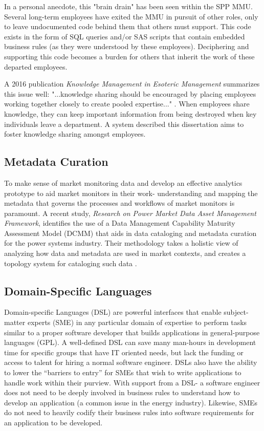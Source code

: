 In a personal anecdote, this "brain drain" has been seen within the SPP MMU. Several long-term employees have exited the MMU in pursuit of other roles, only to leave undocumented code behind them that others must support. This code exists in the form of SQL queries and/or SAS scripts that contain embedded business rules (as they were understood by these employees). Deciphering and supporting this code becomes a burden for others that inherit the work of these departed employees.

A 2016 publication \textit{Knowledge Management in Esoteric Management} summarizes this issue well: "...knowledge sharing should be encouraged by placing employees working together closely to create pooled expertise..." \cite{knowledge-management-in-esoteric-management}. When employees share knowledge, they can keep important information from being destroyed when key individuals leave a department. A system described this dissertation aims to foster knowledge sharing amongst employees.

\subsection{Metadata Curation}

To make sense of market monitoring data and develop an effective analytics prototype to aid market monitors in their work- understanding and mapping the metadata that governs the processes and workflows of market monitors is paramount. A recent study, \textit{Research on Power Market Data Asset Management Framework}, identifies the use of a Data Management Capability Maturity Assessment Model (DCMM) that aids in data cataloging and metadata curation for the power systems industry. Their methodology takes a holistic view of analyzing how data and metadata are used in market contexts, and creates a topology system for cataloging such data \cite{marketdataasset}.

\subsection{Domain-Specific Languages}

Domain-specific Languages (DSL) are powerful interfaces that enable subject-matter experts (SME) in any particular domain of expertise to perform tasks similar to a proper software developer that builds applications in general-purpose languages (GPL). A well-defined DSL can save many man-hours in development time for specific groups that have IT oriented needs, but lack the funding or access to talent for hiring a normal software engineer. DSLs also have the ability to lower the “barriers to entry” for SMEs that wish to write applications to handle work within their purview. With support from a DSL- a software engineer does not need to be deeply involved in business rules to understand how to develop an application (a common issue in the energy industry). Likewise, SMEs do not need to heavily codify their business rules into software requirements for an application to be developed.

